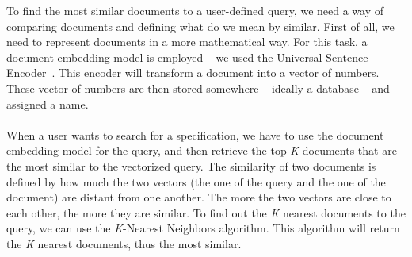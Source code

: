 To find the most similar documents to a user-defined query, we need a way of comparing documents and defining what do we mean by similar.
First of all, we need to represent documents in a more mathematical way.
For this task, a document embedding model is employed -- we used the Universal Sentence Encoder~\cite{cer2018universal}.
This encoder will transform a document into a vector of numbers.
These vector of numbers are then stored somewhere -- ideally a database -- and assigned a name. \\ \\
When a user wants to search for a specification, we have to use the document embedding model for the query, and then retrieve the top \textit{K} documents that are the most similar to the vectorized query.
The similarity of two documents is defined by how much the two vectors (the one of the query and the one of the document) are distant from one another.
The more the two vectors are close to each other, the more they are similar.
To find out the \textit{K} nearest documents to the query, we can use the \textit{K}-Nearest Neighbors algorithm.
This algorithm will return the \textit{K} nearest documents, thus the most similar.